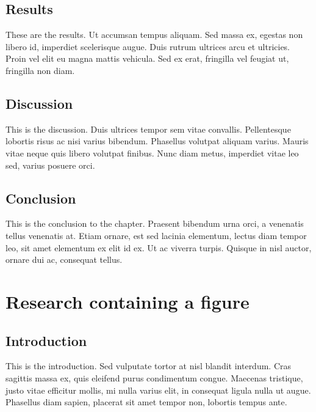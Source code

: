 \documentclass[12pt,a4paper,]{report}
\begin{document}
\hypertarget{results}{%
\section{Results}\label{results}}

These are the results. Ut accumsan tempus aliquam. Sed massa ex, egestas
non libero id, imperdiet scelerisque augue. Duis rutrum ultrices arcu et
ultricies. Proin vel elit eu magna mattis vehicula. Sed ex erat,
fringilla vel feugiat ut, fringilla non diam.

\hypertarget{discussion}{%
\section{Discussion}\label{discussion}}

This is the discussion. Duis ultrices tempor sem vitae convallis.
Pellentesque lobortis risus ac nisi varius bibendum. Phasellus volutpat
aliquam varius. Mauris vitae neque quis libero volutpat finibus. Nunc
diam metus, imperdiet vitae leo sed, varius posuere orci.

\hypertarget{conclusion-1}{%
\section{Conclusion}\label{conclusion-1}}

This is the conclusion to the chapter. Praesent bibendum urna orci, a
venenatis tellus venenatis at. Etiam ornare, est sed lacinia elementum,
lectus diam tempor leo, sit amet elementum ex elit id ex. Ut ac viverra
turpis. Quisque in nisl auctor, ornare dui ac, consequat tellus.

\hypertarget{research-containing-a-figure}{%
\chapter{Research containing a
figure}\label{research-containing-a-figure}}

\hypertarget{introduction-2}{%
\section{Introduction}\label{introduction-2}}

This is the introduction. Sed vulputate tortor at nisl blandit interdum.
Cras sagittis massa ex, quis eleifend purus condimentum congue. Maecenas
tristique, justo vitae efficitur mollis, mi nulla varius elit, in
consequat ligula nulla ut augue. Phasellus diam sapien, placerat sit
amet tempor non, lobortis tempus ante.
\end{document}
